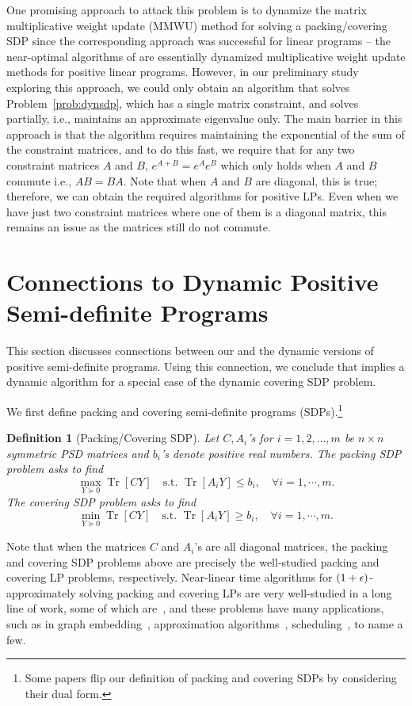 \documentclass[11pt]{article}
\newtheorem{definition}[theorem]{Definition}
\DeclareMathOperator{\Tr}{Tr}
\renewcommand\AA{\boldsymbol{\mathit{A}}}
\newcommand\BB{\boldsymbol{\mathit{B}}}
\newcommand\CC{\boldsymbol{\mathit{C}}}
\newcommand\YY{\boldsymbol{\mathit{Y}}}
\begin{document}
One promising approach to attack this problem is to dynamize the matrix multiplicative weight update (MMWU) method for solving a packing/covering SDP \cite{peng2012faster} since the corresponding approach was successful for linear programs -- the near-optimal algorithms of \cite{bhattacharya2023dynamic} are essentially dynamized multiplicative weight update methods for positive linear programs. However, in our preliminary study exploring this approach, we could only obtain an algorithm that solves Problem~\ref{prob:dynsdp}, which has a single matrix constraint, and  solves~ partially, i.e., maintains an approximate eigenvalue only. The main barrier in this approach is that the algorithm requires maintaining the exponential of the sum of the constraint matrices, and to do this fast, we require that for any two constraint matrices $\AA$ and $\BB$, $e^{\AA+\BB}= e^{\AA} e^{\BB}$ which only holds when $\AA$ and $\BB$ commute i.e., $\AA\BB = \BB\AA$. Note that when $\AA$ and $\BB$ are diagonal, this is true; therefore, we can obtain the required algorithms for positive LPs. Even when we have just two constraint matrices where one of them is a diagonal matrix, this remains an issue as the matrices still do not commute. 
 	 \newpage
	\printbibliography
	
	
	 \newpage
	\appendix
	\section{Connections to Dynamic Positive Semi-definite Programs}
\label{sec:dyn psd}
This section discusses connections between our  and the dynamic versions of positive semi-definite programs. Using this connection, we conclude that  implies a dynamic algorithm for a special case of the dynamic covering SDP problem. 

We first define packing and covering semi-definite programs (SDPs).\footnote{Some papers \cite{jambulapati2021positive} flip our definition of packing and covering SDPs by considering their dual form.}


\begin{definition}[Packing/Covering SDP] Let $\CC, \AA_i$'s for $i = 1,2,...,m$ be $n\times n$ symmetric PSD matrices and $b_i$'s denote positive real numbers. The packing SDP problem asks to find
\[
\max_{\YY\succeq 0} \Tr[\CC\YY]  \quad \text{s.t.  } \Tr[\AA_i\YY]\leq b_i, \quad\forall i = 1,\cdots, m.
\]
The covering SDP problem asks to find
\[
\min_{\YY\succeq 0} \Tr[\CC\YY]  \quad \text{s.t.  } \Tr[\AA_i\YY]\geq b_i, \quad\forall i = 1,\cdots, m.
\]
\end{definition}
Note that when the matrices $\CC$ and $\AA_i$'s are all diagonal matrices, the packing and covering SDP problems above are precisely the well-studied packing and covering LP problems, respectively. Near-linear time algorithms for $(1+\epsilon)$-approximately solving packing and covering LPs are very well-studied in a long line of work, some of which are~\cite{allen2015nearly,allen2019nearly,wang2016unified,quanrud2020nearly}, and these problems have many applications, such as in graph embedding~\cite{plotkin1995fast}, approximation algorithms~\cite{luby1993parallel,trevisan1998parallel}, scheduling~\cite{plotkin1995fast}, to name a few.
\end{document}
